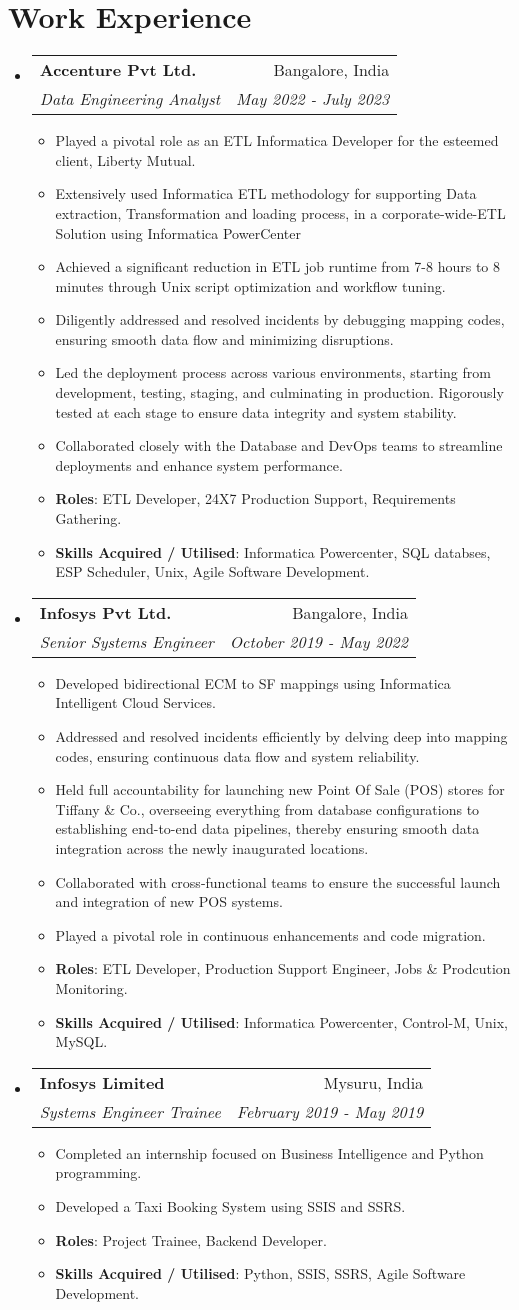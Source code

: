 \documentclass[a4paper,20pt]{article}
\makeatletter
\newcommand{\resumeItem}[2]{
  \item\small{
    \textbf{#1}{: #2 \vspace{-2pt}}
  }
}
\newcommand{\resumeItemWithoutTitle}[1]{
  \item\small{
    {#1\vspace{-2pt}}
  }
}
\newcommand{\resumeSubheading}[4]{
  \vspace{-1pt}\item
    \begin{tabular*}{0.97\textwidth}{l@{\extracolsep{\fill}}r}
      \textbf{#1} & #2 \\
      \textit{#3} & \textit{#4} \\
    \end{tabular*}\vspace{-5pt}
}
\newcommand{\resumeSubHeadingListStart}{\begin{itemize}[leftmargin=*]}
\newcommand{\resumeSubHeadingListEnd}{\end{itemize}}
\newcommand{\resumeItemListStart}{\begin{itemize}}
\newcommand{\resumeItemListEnd}{\end{itemize}\vspace{-5pt}}
\makeatother
\begin{document}
\section{Work Experience}
\resumeSubHeadingListStart
\resumeSubheading
{Accenture Pvt Ltd.}{Bangalore, India}
{Data Engineering Analyst}{May 2022 - July 2023}
\resumeItemListStart
\resumeItemWithoutTitle{Played a pivotal role as an ETL Informatica Developer for the esteemed client, Liberty Mutual.}
\resumeItemWithoutTitle{Extensively used Informatica ETL methodology for supporting Data extraction, Transformation and loading process, in a corporate-wide-ETL Solution using Informatica PowerCenter}
\resumeItemWithoutTitle{Achieved a significant reduction in ETL job runtime from 7-8 hours to 8 minutes through Unix script optimization and workflow tuning.}
\resumeItemWithoutTitle{Diligently addressed and resolved incidents by debugging mapping codes, ensuring smooth data flow and minimizing disruptions.}
\resumeItemWithoutTitle{Led the deployment process across various environments, starting from development, testing, staging, and culminating in production. Rigorously tested at each stage to ensure data integrity and system stability.}
\resumeItemWithoutTitle{Collaborated closely with the Database and DevOps teams to streamline deployments and enhance system performance.}
\resumeItem{Roles}{ETL Developer, 24X7 Production Support, Requirements Gathering.}
\resumeItem{Skills Acquired / Utilised}{Informatica Powercenter, SQL databses, ESP Scheduler, Unix, Agile Software Development.}
\resumeItemListEnd
\vspace{2pt}
\resumeSubheading
{Infosys Pvt Ltd.}{Bangalore, India}
{Senior Systems Engineer}{October 2019 - May 2022}
\resumeItemListStart
\resumeItemWithoutTitle{Developed bidirectional ECM to SF mappings using Informatica Intelligent Cloud Services.}
\resumeItemWithoutTitle{Addressed and resolved incidents efficiently by delving deep into mapping codes, ensuring continuous data flow and system reliability.}
\resumeItemWithoutTitle{Held full accountability for launching new Point Of Sale (POS) stores for Tiffany & Co., overseeing everything from database configurations to establishing end-to-end data pipelines, thereby ensuring smooth data integration across the newly inaugurated locations.}
\resumeItemWithoutTitle{Collaborated with cross-functional teams to ensure the successful launch and integration of new POS systems.}
\resumeItemWithoutTitle{Played a pivotal role in continuous enhancements and code migration.}
\resumeItem{Roles}{ETL Developer, Production Support Engineer, Jobs & Prodcution Monitoring.}
\resumeItem{Skills Acquired / Utilised}{Informatica Powercenter, Control-M, Unix, MySQL.}
\resumeItemListEnd
\vspace{2pt}
\resumeSubheading
{Infosys Limited}{Mysuru, India}
{Systems Engineer Trainee}{February 2019 - May 2019}
\resumeItemListStart
\resumeItemWithoutTitle{Completed an internship focused on Business Intelligence and Python programming.}
\resumeItemWithoutTitle{Developed a Taxi Booking System using SSIS and SSRS.}
\resumeItem{Roles}{Project Trainee, Backend Developer.}
\resumeItem{Skills Acquired / Utilised}{Python, SSIS, SSRS, Agile Software Development.}
\resumeItemListEnd
\resumeSubHeadingListEnd
\vspace{-5pt}
\end{document}
